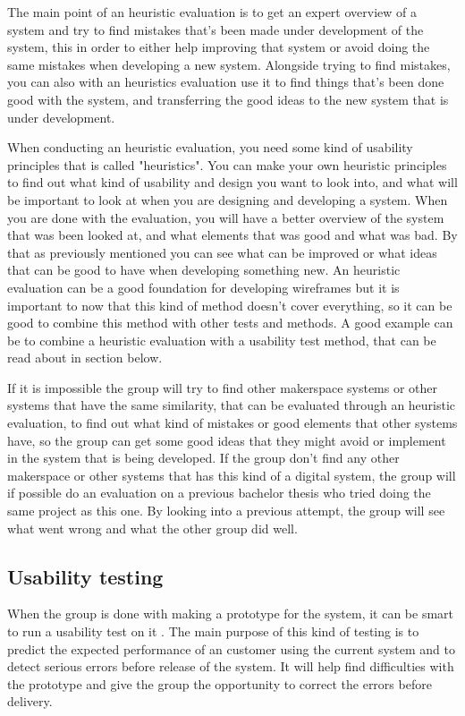 The main point of an heuristic evaluation is to get an expert overview of a system and try to find mistakes that's been made 
under development of the system, this in order to either help improving that system or avoid doing the same mistakes when developing a new system. Alongside trying to find mistakes, you can also with an heuristics evaluation use it to find things that's been done good with the system, and transferring the good ideas to the new system that is under development. 

When conducting an heuristic evaluation, you need some kind of usability principles that is called "heuristics"\cite{heuristic-evaluation}. You can make your own heuristic principles to find out what kind of usability and design you want to look into, and what will be important to look at when you are designing and developing a system. When you are done with the evaluation, you will have a better overview of the system that was been looked at, and what elements that was good and what was bad. By that as previously mentioned you can see what can be improved or what ideas that can be good to have when developing something new. An heuristic evaluation can be a good foundation for developing wireframes but it is important to now that this kind of method doesn't cover everything, so it can be good to combine this method with other tests and methods.\cite{heuristic-evaluation} A good example can be to combine a heuristic evaluation with a usability test method, that can be read about in section below.

If it is impossible the group will try to find other makerspace systems or other systems that have the same similarity, that can be evaluated through an heuristic evaluation, to find out what kind of mistakes or good elements that other systems have, so the group can get some good ideas that they might avoid or implement in the system that is being developed. If the group don't find any other makerspace or other systems that has this kind of a digital system, the group will if possible do an evaluation on a previous bachelor thesis who tried doing the same project as this one. By looking into a previous attempt, the group will see what went wrong and what the other group did well.\cite{heuristic-evaluation}

\subsection{Usability testing}
When the group is done with making a prototype for the system, it can be smart to run a usability test on it \cite{usability-testing}. The main purpose of this kind of testing is to predict the expected performance of an customer using the current system and to detect serious errors before release of the system.\cite{usability-testing}
It will help find difficulties with the prototype and give the group the opportunity to correct the errors before delivery.   

